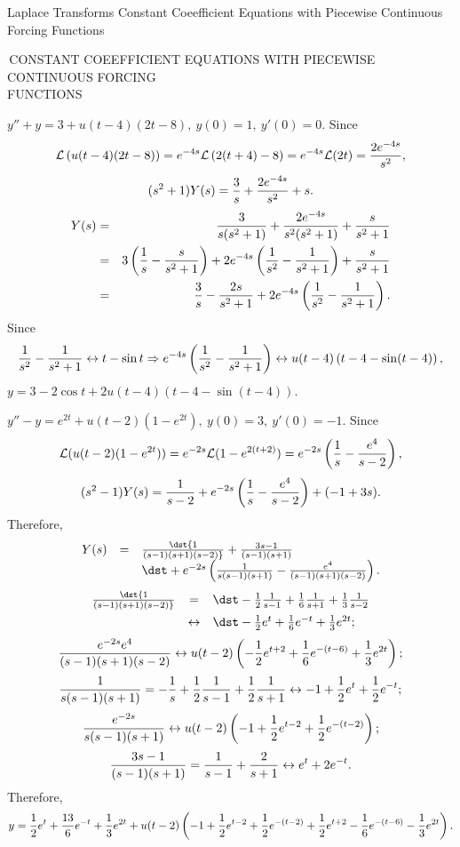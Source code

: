 \documentclass[dvips]{book}
\renewcommand{\exer}[1]{\par\medskip\;\noindent{\color{red}\bf #1.}}
\numberwithin{example}{section}
\numberwithin{equation}{section}
\numberwithin{theorem}{section}
\numberwithin{table}{section}
\numberwithin{figure}{section}
\begin{document}
 {Laplace Transforms}
{Constant Coeefficient Equations with Piecewise Continuous Forcing
Functions}

\renewcommand{\thissection}{\sectiontitle
{\,CONSTANT COEEFFICIENT EQUATIONS WITH PIECEWISE CONTINUOUS FORCING \\
\hspace*{14pt}  FUNCTIONS}}
\thissection

\vspace*{-17.5pt}


\exer{8.5.2}
 $y''+y=3+u(t-4)(2t-8),\ y(0)=1,\ y'(0)=0$.
Since
$$
{\cal L}\left(u(t-4)(2t-8)\right)=e^{-4s}{\cal L}\left(2(t+4)-8\right)
=e^{-4s}{\cal L}(2t)={2e^{-4s}\over s^2},
$$
$$
(s^2+1)Y(s)={3\over s}+{2e^{-4s}\over s^2}+s.
$$
\begin{eqnarray*}
Y(s)&=&{3\over s(s^2+1)}+{2e^{-4s}\over s^2(s^2+1)}+{s\over s^2+1}\\
&=&3\left({1\over s}-{s\over s^2+1}\right)+2e^{-4s}
\left({1\over s^2}-{1\over s^2+1}\right)+{s\over s^2+1}\\
&=&{3\over s}-{2s\over s^2+1}+2e^{-4s}\left({1\over s^2}-{1\over
s^2+1}\right).
\end{eqnarray*}
Since
$$
{1\over s^2}-{1\over s^2+1}\leftrightarrow t-\sin t\Rightarrow
e^{-4s}\left({1\over s^2}-{1\over s^2+1}\right)\leftrightarrow
u(t-4)\left(t-4-\sin(t-4)\right),
$$
$y=3-2\cos t+2u(t-4)\left(t-4-\sin(t-4)\right)$.


\exer{8.5.4}
 $y''-y=e^{2t}+u(t-2)(1-e^{2t}),\ y(0)=3,\ y'(0)=-1$.
Since
$$
{\cal L}(u(t-2)(1-e^{2t}))=e^{-2s}{\cal L}(1-e^{2(t+2)})=e^{-2s}
\left({1\over s}-{e^4\over s-2}\right),
$$
$$
(s^2-1)Y(s)={1\over s-2}+e^{-2s}\left({1\over s}-{e^4\over s-2}\right)
+(-1+3s).
$$
Therefore,
$$
\begin{array}{rcl}
Y(s)&=&\dst{1\over(s-1)(s+1)(s-2)}+{3s-1\over(s-1)(s+1)}\\
&&\dst+e^{-2s}\left({1\over
s(s-1)(s+1)}-{e^4\over(s-1)(s+1)(s-2)}\right).
\end{array}
$$
$$
\begin{array}{rcl}
\dst{1\over(s-1)(s+1)(s-2)}&=&\dst-{1\over2}{1\over
s-1}+{1\over6}{1\over s+1}
+{1\over3}{1\over s-2}\\[2\jot]
&\leftrightarrow&\dst -{1\over2}e^t+{1\over6}e^{-t}+{1\over3}e^{2t};
\end{array}
$$
$$
{e^{-2s}e^4\over(s-1)(s+1)(s-2)}
\leftrightarrow u(t-2)\left(
-{1\over2}e^{t+2}+{1\over6}e^{-(t-6)}+{1\over3}e^{2t}\right);
$$
$$
{1\over s(s-1)(s+1)}=-{1\over s}+{1\over2}{1\over s-1}
+{1\over2}{1\over s+1}
\leftrightarrow -1+{1\over2}e^t+{1\over2}e^{-t};
$$
$$
{e^{-2s}\over s(s-1)(s+1)}
\leftrightarrow
u(t-2)\left(-1+{1\over2}e^{t-2}+{1\over2}e^{-(t-2)}\right);
$$
$$
{3s-1\over(s-1)(s+1)}={1\over s-1}+{2\over s+1}\leftrightarrow
e^t+2e^{-t}.
$$
Therefore,
$$
y={1\over2}e^t+{13\over6}e^{-t}+ {1\over 3}e^{2t}
+u(t-2)\left(-1+{1\over 2}e^{t-2}+{1\over2}e^{-(t-2)}+
{1\over2}e^{t+2}-{1\over6} e^{-(t-6)}-{1\over3}e^{2t}\right).
$$
\end{document}
